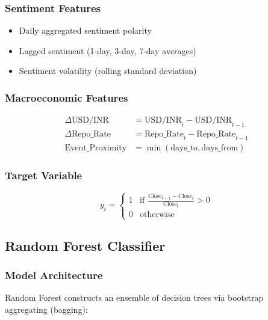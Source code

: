 \documentclass[conference]{IEEEtran}
\begin{document}
\subsubsection{Sentiment Features}

\begin{itemize}
\item Daily aggregated sentiment polarity
\item Lagged sentiment (1-day, 3-day, 7-day averages)
\item Sentiment volatility (rolling standard deviation)
\end{itemize}

\subsubsection{Macroeconomic Features}

\begin{equation}
\begin{aligned}
\Delta \text{USD/INR} &= \text{USD/INR}_t - \text{USD/INR}_{t-1} \\
\Delta \text{Repo\_Rate} &= \text{Repo\_Rate}_t - \text{Repo\_Rate}_{t-1} \\
\text{Event\_Proximity} &= \min(\text{days\_to}, \text{days\_from})
\end{aligned}
\end{equation}

\subsubsection{Target Variable}

\begin{equation}
y_t = \begin{cases}
1 & \text{if } \frac{\text{Close}_{t+1} - \text{Close}_t}{\text{Close}_t} > 0 \\
0 & \text{otherwise}
\end{cases}
\end{equation}

\subsection{Random Forest Classifier}

\subsubsection{Model Architecture}

Random Forest constructs an ensemble of decision trees via bootstrap aggregating (bagging):
\end{document}
